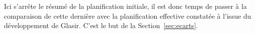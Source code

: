 Ici s'arrête le résumé de la planification initiale, il est donc temps de passer à la comparaison de cette dernière avec la planification effective constatée à l'issue du développement de Glasir. C'est le but de la {\sc Section}~\ref{sec:ecarts}. 

